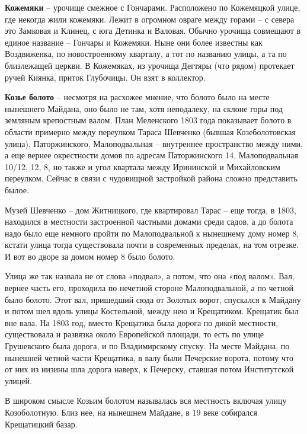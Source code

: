 \medskip


\textbf{Кожемяки} – урочище смежное с Гончарами. Расположено по Кожемяцкой улице, где некогда жили кожемяки. Лежит в огромном овраге между горами – с севера это Замковая и Клинец, с юга Детинка и Валовая. Обычно урочища совмещают в единое название – Гончары и Кожемяки. Ныне они более известны как Воздвиженка, по новостроенному кварталу, а тот по названию улицы, а та по близлежащей церкви. В Кожемяках, из урочища Дегтяры (что рядом) протекает ручей Киянка, приток Глубочицы. Он взят в коллектор.\\

\medskip


\textbf{Козье болото} – несмотря на расхожее мнение, что болото было на месте нынешнего Майдана, оно было не там, хотя неподалеку, на склоне горы под земляным крепостным валом. План Меленского 1803 года показывает болото в области примерно между переулком Тараса Шевченко (бывшая Козеболотовская улица), Паторжинского, Малоподвальная – внутреннее пространство между ними, а еще вернее окрестности домов по адресам Паторжинского 14, Малоподвальная 10/12, 12, 8, но также и угол квартала между Ирининской и Михайловским переулком. Сейчас в связи с чудовищной застройкой района сложно представить былое.

Музей Шевченко – дом Житницкого, где квартировал Тарас – еще тогда, в 1803, находился в местности застроенной частными домами среди садов, а до болота надо было еще немного пройти по Малоподвальной к нынешнему дому номер 8, кстати улица тогда существовала почти в современных пределах, на том отрезке. И вот во дворе за домом номер 8 было болото.

Улица же так назвала не от слова «подвал», а потом, что она «под валом». Вал, вернее часть его, проходила по нечетной стороне Малоподвальной, а по четной было болото. Этот вал, пришедший сюда от Золотых ворот, спускался к Майдану и потом шел вдоль улицы Костельной, между нею и Крещатиком. Крещатик был вне вала. На 1803 год, вместо Крещатика была дорога по дикой местности, существовала и развязка около Европейской площади, то есть по улице Грушевского была дорога, и по Владимирскому спуску. На месте Майдана, по нынешней четной части Крещатика, в валу были Печерские ворота, потому что от них из низины шла дорога наверх, к Печерску, ставшая потом Институтской улицей.

В широком смысле Козьим болотом называлась вся местность включая улицу Козоболотную. Близ нее, на нынешнем Майдане, в 19 веке собирался Крещатицкий базар.\\

